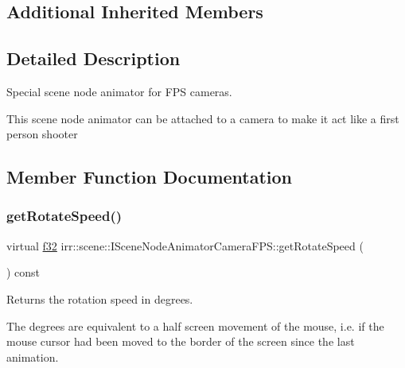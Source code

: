 \subsection*{Additional Inherited Members}


\subsection{Detailed Description}
Special scene node animator for F\+PS cameras. 

This scene node animator can be attached to a camera to make it act like a first person shooter 

\subsection{Member Function Documentation}
\mbox{\label{classirr_1_1scene_1_1ISceneNodeAnimatorCameraFPS_ab8ef30073df3084712346e1a84be6a9e}} 
\subsubsection{\texorpdfstring{get\+Rotate\+Speed()}{getRotateSpeed()}}
{\footnotesize\ttfamily virtual \hyperlink{namespaceirr_a0277be98d67dc26ff93b1a6a1d086b07}{f32} irr\+::scene\+::\+I\+Scene\+Node\+Animator\+Camera\+F\+P\+S\+::get\+Rotate\+Speed (\begin{DoxyParamCaption}{ }\end{DoxyParamCaption}) const\hspace{0.3cm}{\ttfamily [pure virtual]}}



Returns the rotation speed in degrees. 

The degrees are equivalent to a half screen movement of the mouse, i.\+e. if the mouse cursor had been moved to the border of the screen since the last animation. \mbox{\label{classirr_1_1scene_1_1ISceneNodeAnimatorCameraFPS_abe634d0c7b03cc6f5adb9df3f04bacd5}} 
